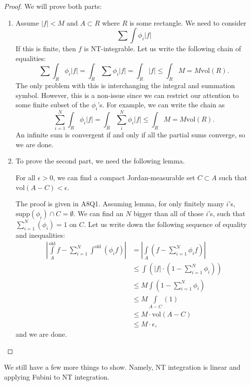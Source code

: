 \documentclass{article}
\numberwithin{equation}{section}
\begin{document}
\begin{proof}
    We will prove both parts:
    \begin{enumerate}
        \item Assume $|f| < M$ and $A \subset R$ where $R$ is some rectangle. We need to consider
        \begin{equation}
            \sum \int \phi_i |f|
        \end{equation}
        If this is finite, then $f$ is NT-integrable. Let us write the following chain of equalities:
        \begin{equation}
            \sum \int_R \phi_i |f| = \int_R \sum \phi_i |f| = \int_R |f| \le \int_R M =  M\text{vol}(R).
        \end{equation}
        The only problem with this is interchanging the integral and summation symbol. However, this is a non-issue since we can restrict our attention to some finite subset of the $\phi_i$'s. For example, we can write the chain as 
        \begin{equation}
            \sum_{i=1}^N \int_R \phi_i |f| = \int_R \sum_{i}^N \phi_i |f| \le \int_R M =  M\text{vol}(R).
        \end{equation}
        An infinite sum is convergent if and only if all the partial sums converge, so we are done.
        \item To prove the second part, we need the following lemma.
        \begin{lemma}
            For all $\epsilon > 0$, we can find a compact Jordan-measurable set $C \subset A$ such that $\text{vol}(A-C) < \epsilon.$
        \end{lemma}
        The proof is given in A8Q1. Assuming lemma, for only finitely many $i$'s, $\text{supp}(\phi_i) \cap C = \emptyset.$ We can find an $N$ bigger than all of those $i$'s, such that $\sum_{i=1}^{N}(\phi_i) = 1$ on $C$. Let us write down the following sequence of equality and inequalities:
        \begin{align}
            \left|\int\limits_{A}^{\text{old}} f - \sum_{i=1}^N \int^{\text{old}}(\phi_i f)\right| &= \left|\int\limits_A \left(f - \sum_{i=1}^N \phi_i f\right)\right| \\
            &\le \int \left(|f| \cdot \left(1 - \sum_{i=1}^N \phi_i\right)\right) \\ 
            &\le M\int \left(1-\sum_{i=1}^N \phi_i\right) \\ 
            &\le M\int\limits_{A-C}(1) \\ 
            &\le M \cdot \text{vol}(A-C) \\ 
            &\le M\cdot \epsilon,
        \end{align}
        and we are done.
    \end{enumerate}
\end{proof}
We still have a few more things to show. Namely, NT integration is linear and applying Fubini to NT integration.
\end{document}
